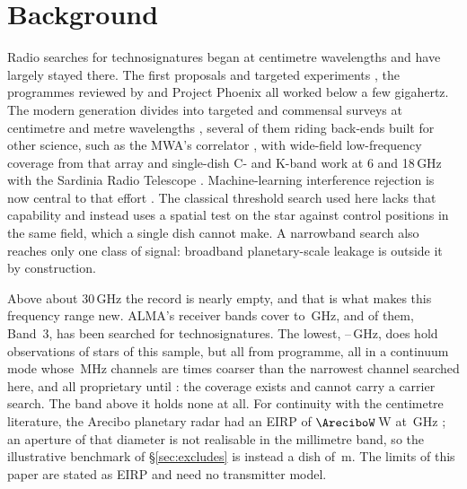 \section{Background}
\label{sec:background}

Radio searches for technosignatures began at centimetre wavelengths and
have largely stayed there. The first proposals and targeted experiments
\citep{CocconiMorrison1959,Drake1960}, the programmes reviewed by
\citet{Tarter2001} and Project Phoenix \citep{Backus2002} all worked
below a few gigahertz. The modern generation divides into targeted and
commensal surveys at centimetre and metre wavelengths
\citep{Zhang2020,Czech2021,FAST3IATLAS2025,LOFARdualsite2023,Choza2024},
several of them riding back-ends built for other science, such as the MWA's
correlator \citep{Morrison2023}, with wide-field low-frequency coverage from
that array \citep{Tremblay2024}
and single-dish C- and K-band work at 6 and 18\,GHz with the Sardinia
Radio Telescope \citep{SRT2025}. Machine-learning interference rejection
is now central to that effort
\citep{Ma2023,GLOBULAR2025,AnomalyParkesGBT2025}. The classical threshold
search used here lacks that capability and instead uses a spatial test on
the star against control positions in the same field, which a single dish
cannot make. A narrowband search also reaches only one class of signal:
broadband planetary-scale leakage \citep{BRaTs2026} is outside it by
construction.

Above about 30\,GHz the record is nearly empty, and that is what makes
this frequency range new. ALMA's \SbNBand{} receiver bands cover
\SbBandLoGHz{} to \SbBandHiGHz\,GHz, and \SbNPriorBandWord{} of them, Band~3,
has been searched for technosignatures. The lowest,
\SbBandOneLoGHz--\SbBandOneHiGHz\,GHz, does hold observations of
\SbBoneNStar{} stars of this sample, but all from \SbBoneNProgWord{}
programme, all in a
continuum mode whose \SbBoneChanMHz\,MHz channels are \SbBoneChanRatio{}
times coarser than the narrowest channel searched here, and all
proprietary until \SbBoneRelYear: the coverage exists and cannot carry a
carrier search. The band above it holds none at all. For continuity with
the centimetre literature, the Arecibo planetary radar had an EIRP of
$\AreciboW$\,W at \ArecGHz\,GHz \citep{EarthDetectingEarth2025}; an
aperture of that diameter is not realisable in the millimetre band, so the
illustrative benchmark of \S\ref{sec:excludes} is instead a dish of
\BenchDiam\,m. The limits of this paper are stated as EIRP and need no
transmitter model.

